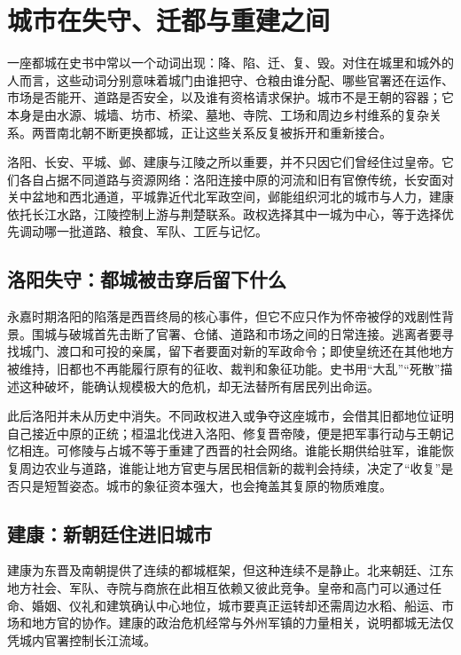 \section{城市在失守、迁都与重建之间}
\label{sec:synthesis-cities}

一座都城在史书中常以一个动词出现：降、陷、迁、复、毁。对住在城里和城外的人而言，这些动词分别意味着城门由谁把守、仓粮由谁分配、哪些官署还在运作、市场是否能开、道路是否安全，以及谁有资格请求保护。城市不是王朝的容器；它本身是由水源、城墙、坊市、桥梁、墓地、寺院、工场和周边乡村维系的复杂关系。两晋南北朝不断更换都城，正让这些关系反复被拆开和重新接合。

洛阳、长安、平城、邺、建康与江陵之所以重要，并不只因它们曾经住过皇帝。它们各自占据不同道路与资源网络：洛阳连接中原的河流和旧有官僚传统，长安面对关中盆地和西北通道，平城靠近代北军政空间，邺能组织河北的城市与人力，建康依托长江水路，江陵控制上游与荆楚联系。政权选择其中一城为中心，等于选择优先调动哪一批道路、粮食、军队、工匠与记忆。

\subsection{洛阳失守：都城被击穿后留下什么}

永嘉时期洛阳的陷落是西晋终局的核心事件，但它不应只作为怀帝被俘的戏剧性背景。围城与破城首先击断了官署、仓储、道路和市场之间的日常连接。逃离者要寻找城门、渡口和可投的亲属，留下者要面对新的军政命令；即使皇统还在其他地方被维持，旧都也不再能履行原有的征收、裁判和象征功能。史书用“大乱”“死散”描述这种破坏，能确认规模极大的危机，却无法替所有居民列出命运。

此后洛阳并未从历史中消失。不同政权进入或争夺这座城市，会借其旧都地位证明自己接近中原的正统；桓温北伐进入洛阳、修复晋帝陵，便是把军事行动与王朝记忆相连。可修陵与占城不等于重建了西晋的社会网络。谁能长期供给驻军，谁能恢复周边农业与道路，谁能让地方官吏与居民相信新的裁判会持续，决定了“收复”是否只是短暂姿态。城市的象征资本强大，也会掩盖其复原的物质难度。

\subsection{建康：新朝廷住进旧城市}

建康为东晋及南朝提供了连续的都城框架，但这种连续不是静止。北来朝廷、江东地方社会、军队、寺院与商旅在此相互依赖又彼此竞争。皇帝和高门可以通过任命、婚姻、仪礼和建筑确认中心地位，城市要真正运转却还需周边水稻、船运、市场和地方官的协作。建康的政治危机经常与外州军镇的力量相关，说明都城无法仅凭城内官署控制长江流域。

